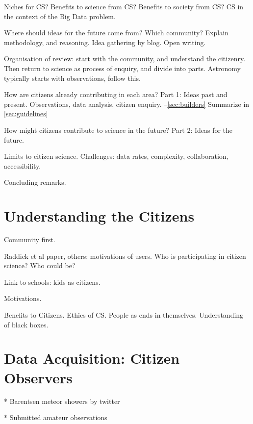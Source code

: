 \documentclass{ar2e}
\begin{document}
Niches for CS?
Benefits to science from CS?
Benefits to society from CS?
CS in the context of the Big Data problem.

Where should ideas for the future come from? Which community?
Explain methodology, and reasoning. Idea gathering by blog. Open writing.

Organisation of review: start with the community, and understand the citizenry.
Then return to science as process of enquiry, and divide into parts. Astronomy
typically starts with observations, follow this.

How are citizens already contributing in each area? Part 1: Ideas past and
present.  Observations, data analysis, citizen enquiry.
--\ref{sec:builders} Summarize in \ref{sec:guidelines}

How might citizens contribute to science in the future?
Part 2: Ideas for the future. 

Limits to citizen science. Challenges: data rates, complexity, collaboration,
accessibility. 

Concluding remarks. 



\section{Understanding the Citizens}
\label{sec:crowd}

Community first.

Raddick et al paper, others: motivations of users. 
Who is participating in citizen science? Who could be?

Link to schools: kids as citizens. 

Motivations.

Benefits to Citizens. Ethics of CS.
People as ends in themselves. Understanding of black boxes. 



\section{Data Acquisition: Citizen Observers}
\label{sec:observers}

* Barentsen meteor showers by twitter

* Submitted amateur observations
\end{document}
